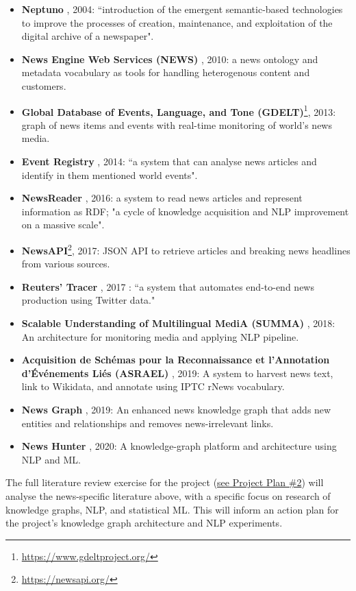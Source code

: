 \documentclass[11pt]{article}
\begin{document}
\begin{itemize}
\item \textbf{Neptuno} \cite{castells2004neptuno}, 2004: ``introduction of the emergent semantic-based technologies to improve the processes of creation, maintenance, and exploitation of the digital archive of a newspaper".
\item \textbf{News Engine Web Services (NEWS)} \cite{fernandez2010news}, 2010: a news ontology and metadata vocabulary as tools for handling heterogenous content and customers.
\item \textbf{Global Database of Events, Language, and Tone (GDELT)}\footnote{\url{https://www.gdeltproject.org/}}, 2013: graph of news items and events with real-time monitoring of world's news media.
\item \textbf{Event Registry} \cite{leban2014event}, 2014: ``a system that can analyse news articles and identify in them mentioned world events".
\item \textbf{NewsReader} \cite{vossen2016newsreader}, 2016: a system to read news articles and represent information as RDF; "a cycle of knowledge acquisition and NLP improvement on a massive scale".
\item \textbf{NewsAPI}\footnote{\url{https://newsapi.org/}}, 2017: JSON API to retrieve articles and breaking news headlines from various sources.
\item \textbf{Reuters' Tracer} \cite{liu2017reuters}, 2017 : ``a system that automates end-to-end news production using Twitter data."
\item \textbf{Scalable Understanding of Multilingual MediA (SUMMA)} \cite{germann2018integrating}, 2018: An architecture for monitoring media and applying NLP pipeline.
\item \textbf{Acquisition de Schémas pour la Reconnaissance et l'Annotation d'Événements Liés (ASRAEL)} \cite{rudnik2019searching}, 2019: A system to harvest news text, link to Wikidata, and annotate using IPTC rNews vocabulary.
\item \textbf{News Graph} \cite{liu2019news}, 2019: An enhanced news knowledge graph that adds new entities and relationships and removes news-irrelevant links.
\item \textbf{News Hunter} \cite{berven2020knowledge}, 2020: A knowledge-graph platform and architecture using NLP and ML.
\end{itemize}

The full literature review exercise for the project (\hyperref[sec:PropLiteratureReview]{see Project Plan \#2}) will analyse the news-specific literature above, with a specific focus on research of knowledge graphs, NLP, and statistical ML. This will inform an action plan for the project's knowledge graph architecture and NLP experiments.
\end{document}
